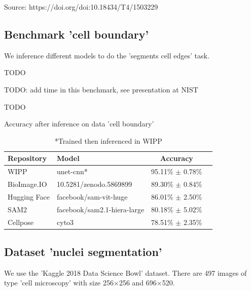 \medskip

Source: https://doi.org/doi:10.18434/T4/1503229

\subsection{Benchmark 'cell boundary'}

We inference different models to do the 'segments cell edges' task.

TODO

TODO: add time in this benchmark, see presentation at NIST

TODO

\begin{table}[H]
  \footnotesize
  \centering
  \caption{Accuracy after inference on data 'cell boundary'}
  \begin{tabular}{llcc}
    \toprule
    Repository    & Model                       & Accuracy             \\ [0.5ex]
    \midrule
    WIPP          & unet-cnn*                   & 95.11\% $\pm$ 0.78\% \\
    BioImage.IO   & 10.5281/zenodo.5869899      & 89.30\% $\pm$ 0.84\% \\
    Hugging Face  & facebook/sam-vit-huge       & 86.01\% $\pm$ 2.50\% \\
    SAM2          & facebook/sam2.1-hiera-large & 80.18\% $\pm$ 5.02\% \\
    Cellpose      & cyto3                       & 78.51\% $\pm$ 2.35\% \\
    \bottomrule
  \end{tabular}
  \caption*{*Trained then inferenced in WIPP}
\end{table}

\subsection{Dataset 'nuclei segmentation'}

We use the 'Kaggle 2018 Data Science Bowl' dataset. There are 497 images of type
'cell microscopy' with size 256$\times$256 and 696$\times$520.

\medskip

